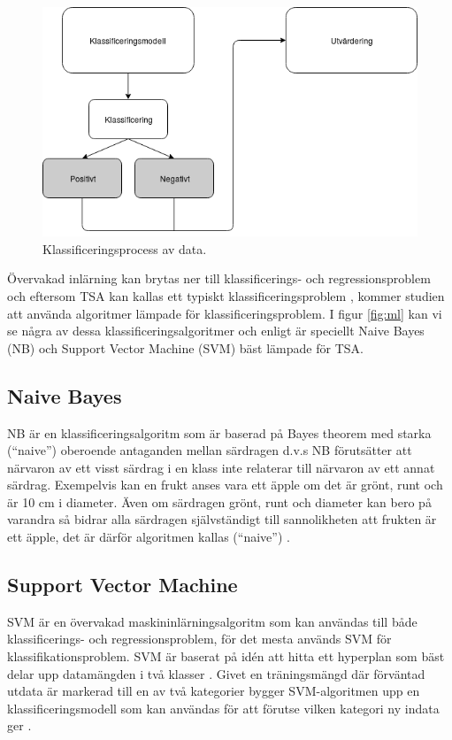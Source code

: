 \documentclass{kaumasters} %
\begin{document}
\begin{figure}[h]
\includegraphics[width=12cm]{klassmodell}
\centering
\caption{Klassificeringsprocess av data.}
\label{fig:kl}
\end{figure}

Övervakad inlärning kan brytas ner till klassificerings- och regressionsproblem och eftersom TSA kan kallas ett typiskt klassificeringsproblem \cite{SAsurvey}, kommer studien att använda algoritmer lämpade för klassificeringsproblem. I figur \ref{fig:ml} kan vi se några av dessa klassificeringsalgoritmer och enligt \cite{TSAsurvey} är speciellt Naive Bayes (NB) och Support Vector Machine (SVM)  bäst lämpade för TSA.

\subsection{Naive Bayes} \label{MLnb}
NB är en klassificeringsalgoritm som är baserad på Bayes theorem \cite{wiki:009} med starka (“naive”) oberoende antaganden mellan särdragen d.v.s NB förutsätter att närvaron av ett visst särdrag i en klass inte relaterar till närvaron av ett annat särdrag. 
Exempelvis kan en frukt anses vara ett äpple om det är grönt, runt och är 10 cm i diameter. Även om särdragen grönt, runt och diameter kan bero på varandra så bidrar alla särdragen självständigt till sannolikheten att frukten är ett äpple, det är därför algoritmen kallas (“naive”) \cite{nb:001}.

\subsection{Support Vector Machine} \label{MLsvm}
SVM är en övervakad maskininlärningsalgoritm som kan användas till både klassificerings- och regressionsproblem, för det mesta används SVM för klassifikationsproblem. SVM är baserat på idén att hitta ett hyperplan \cite{svm:001} som bäst delar upp datamängden i två klasser \cite{svm:003}. Givet en träningsmängd där förväntad utdata är markerad till en av två kategorier bygger SVM-algoritmen upp en klassificeringsmodell som kan användas för att förutse vilken kategori ny indata ger \cite{svm:002}. 
\end{document}
